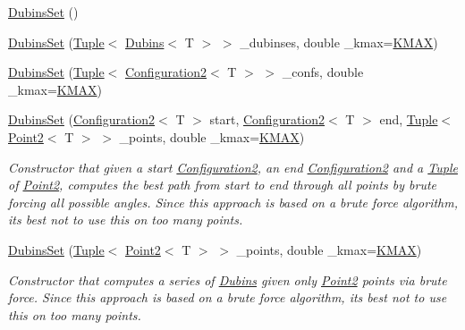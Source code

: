 \begin{DoxyCompactItemize}
\item 
\mbox{\hyperlink{class_dubins_set_a86b2db7ab4ca20735b9fdeb0bf847d76}{Dubins\+Set}} ()
\item 
\mbox{\hyperlink{class_dubins_set_a36295af30ddae6a33bb6a8e35aee7eb1}{Dubins\+Set}} (\mbox{\hyperlink{class_tuple}{Tuple}}$<$ \mbox{\hyperlink{class_dubins}{Dubins}}$<$ T $>$ $>$ \+\_\+dubinses, double \+\_\+kmax=\mbox{\hyperlink{dubins_8hh_a940b85a83458e94519f2685b33ddd276}{K\+M\+AX}})
\item 
\mbox{\hyperlink{class_dubins_set_a60ae5e28b776ad39e965d4019e448d94}{Dubins\+Set}} (\mbox{\hyperlink{class_tuple}{Tuple}}$<$ \mbox{\hyperlink{class_configuration2}{Configuration2}}$<$ T $>$ $>$ \+\_\+confs, double \+\_\+kmax=\mbox{\hyperlink{dubins_8hh_a940b85a83458e94519f2685b33ddd276}{K\+M\+AX}})
\item 
\mbox{\hyperlink{class_dubins_set_a209e9ffddb76419c3ac103afb73b2b10}{Dubins\+Set}} (\mbox{\hyperlink{class_configuration2}{Configuration2}}$<$ T $>$ start, \mbox{\hyperlink{class_configuration2}{Configuration2}}$<$ T $>$ end, \mbox{\hyperlink{class_tuple}{Tuple}}$<$ \mbox{\hyperlink{class_point2}{Point2}}$<$ T $>$ $>$ \+\_\+points, double \+\_\+kmax=\mbox{\hyperlink{dubins_8hh_a940b85a83458e94519f2685b33ddd276}{K\+M\+AX}})
\begin{DoxyCompactList}\small\item\em Constructor that given a start {\ttfamily \mbox{\hyperlink{class_configuration2}{Configuration2}}}, an end {\ttfamily \mbox{\hyperlink{class_configuration2}{Configuration2}}} and a {\ttfamily \mbox{\hyperlink{class_tuple}{Tuple}}} of {\ttfamily \mbox{\hyperlink{class_point2}{Point2}}}, computes the best path from start to end through all points by brute forcing all possible angles. Since this approach is based on a brute force algorithm, it\textquotesingle{}s best not to use this on too many points. \end{DoxyCompactList}\item 
\mbox{\hyperlink{class_dubins_set_a4a85ce188aeabebf88509c2f60ceff31}{Dubins\+Set}} (\mbox{\hyperlink{class_tuple}{Tuple}}$<$ \mbox{\hyperlink{class_point2}{Point2}}$<$ T $>$ $>$ \+\_\+points, double \+\_\+kmax=\mbox{\hyperlink{dubins_8hh_a940b85a83458e94519f2685b33ddd276}{K\+M\+AX}})
\begin{DoxyCompactList}\small\item\em Constructor that computes a series of {\ttfamily \mbox{\hyperlink{class_dubins}{Dubins}}} given only {\ttfamily \mbox{\hyperlink{class_point2}{Point2}}} points via brute force. Since this approach is based on a brute force algorithm, it\textquotesingle{}s best not to use this on too many points. \end{DoxyCompactList}\item 

\end{DoxyCompactItemize}
